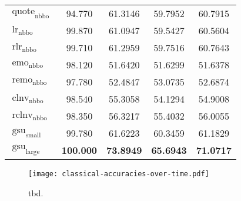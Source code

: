 \begin{table}[H]
\begin{tabular}{lSSSS}
        $\operatorname{quote}_{\mathrm{nbbo}}$ & 94.770            & 61.3146                            & 59.7952           & 60.7915           \\
        $\operatorname{lr}_{\mathrm{nbbo}}$    & 99.870            & 61.0947                            & 59.5427           & 60.5604           \\
        $\operatorname{rlr}_{\mathrm{nbbo}}$   & 99.710            & 61.2959                            & 59.7516           & 60.7643           \\
        $\operatorname{emo}_{\mathrm{nbbo}}$   & 98.120            & 51.6420                            & 51.6299           & 51.6378           \\
        $\operatorname{remo}_{\mathrm{nbbo}}$  & 97.780            & 52.4847                            & 53.0735           & 52.6874           \\
        $\operatorname{clnv}_{\mathrm{nbbo}}$  & 98.540            & 55.3058                            & 54.1294           & 54.9008           \\
        $\operatorname{rclnv}_{\mathrm{nbbo}}$ & 98.350            & 56.3217                            & 55.4032           & 56.0055           \\\midrule
        $\operatorname{gsu}_{\mathrm{small}}$  & 99.780            & 61.6223                            & 60.3459           & 61.1829           \\
        $\operatorname{gsu}_{\mathrm{large}}$  & \bfseries 100.000 & \bfseries 73.8949                  & \bfseries 65.6943 & \bfseries 71.0717 \\\bottomrule
    \end{tabular}
\end{table}


\begin{figure}[ht]
    \centering
    \texttt{[image: classical-accuracies-over-time.pdf]}
    \caption[tbd]{tbd.}
    \label{fig:classical-accuracies-over-time}
\end{figure}


